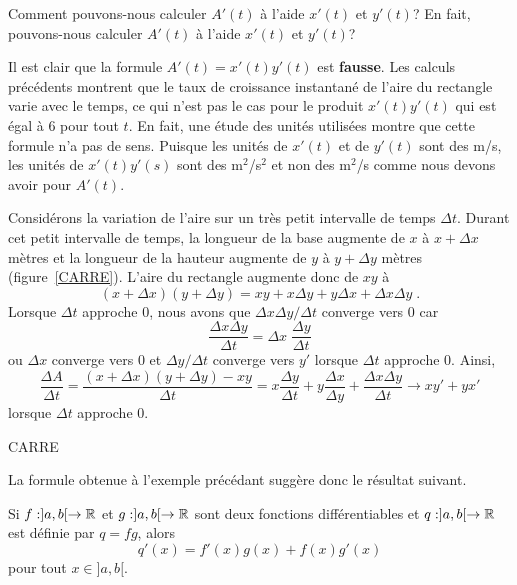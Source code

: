 {\begin{egg}
Comment pouvons-nous calculer $A'(t)$ à l'aide $x'(t)$ et $y'(t)$?  En
fait, pouvons-nous calculer $A'(t)$ à l'aide $x'(t)$ et $y'(t)$?

Il est clair que la formule $A'(t) = x'(t) y'(t)$ est
{\bfseries fausse}.  Les calculs précédents montrent que le taux de
croissance instantané de l'aire du rectangle varie avec le temps, ce
qui n'est pas le cas pour le produit $x'(t)y'(t)$ qui est égal à $6$
pour tout $t$.  En fait, une étude des unités utilisées montre que
cette formule n'a pas de sens.  Puisque les unités de $x'(t)$ et de
$y'(t)$ sont des m/s, les unités de $x'(t) y'(s)$ sont des m$^2$/s$^2$
et non des m$^2$/s comme nous devons avoir pour $A'(t)$.

Considérons la variation de l'aire sur un très petit intervalle de
temps $\Delta t$.  Durant cet petit intervalle de temps, la longueur
de la base augmente de $x$ à $x+\Delta x$ mètres et la longueur de la
hauteur augmente de $y$ à $y+\Delta y$ mètres (figure~\ref{CARRE}).
L'aire du rectangle augmente donc de $xy$ à
\[
(x+ \Delta x)(y + \Delta y) = x y+ x \Delta y +y \Delta x + \Delta x
\Delta y \; .
\]
Lorsque $\Delta t$ approche $0$, nous avons que
$\Delta x \Delta y / \Delta t$ converge vers $0$ car
\[
\frac{\Delta x \Delta y}{\Delta t} =
\Delta x \; \frac{\Delta y}{\Delta t}
\]
ou $\Delta x$ converge vers $0$ et $\Delta y/\Delta t$
converge vers $y'$ lorsque $\Delta t$ approche $0$.  Ainsi,
\[
\frac{\Delta A}{\Delta t} =
\frac{(x+ \Delta x)(y + \Delta y)-xy}{\Delta t}
= x \frac{\Delta y}{\Delta t} + y \frac{\Delta x}{\Delta y} 
+ \frac{\Delta x \Delta y}{\Delta t} \to x y' + y x'
\]
lorsque $\Delta t$ approche $0$.
\end{egg}

{CARRE}

La formule obtenue à l'exemple précédant suggère donc le résultat suivant.

\begin{focus}{\thm}
Si $f:]a,b[\rightarrow \mathbb{R}$ et $g:]a,b[\rightarrow \mathbb{R}$ sont deux
fonctions différentiables et $q:]a,b[\rightarrow \mathbb{R}$ est définie par
$q = fg$, alors
\[
q'(x) = f'(x) g(x) + f(x) g'(x)
\]
pour tout $x\in ]a,b[$.
\end{focus}

}
